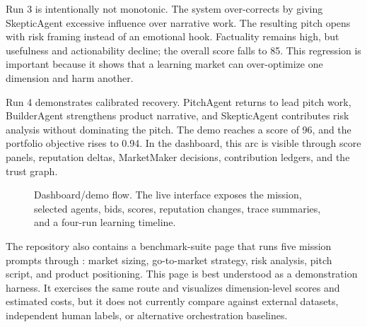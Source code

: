 Run 3 is intentionally not monotonic. The system over-corrects by giving SkepticAgent excessive influence over narrative work. The resulting pitch opens with risk framing instead of an emotional hook. Factuality remains high, but usefulness and actionability decline; the overall score falls to 85. This regression is important because it shows that a learning market can over-optimize one dimension and harm another.

Run 4 demonstrates calibrated recovery. PitchAgent returns to lead pitch work, BuilderAgent strengthens product narrative, and SkepticAgent contributes risk analysis without dominating the pitch. The demo reaches a score of 96, and the portfolio objective rises to 0.94. In the dashboard, this arc is visible through score panels, reputation deltas, MarketMaker decisions, contribution ledgers, and the trust graph.

\begin{figure}[t]
\centering
{}
\caption{Dashboard/demo flow. The live interface exposes the mission, selected agents, bids, scores, reputation changes, trace summaries, and a four-run learning timeline.}
\label{fig:dashboard}
\end{figure}

The repository also contains a benchmark-suite page that runs five mission prompts through : market sizing, go-to-market strategy, risk analysis, pitch script, and product positioning. This page is best understood as a demonstration harness. It exercises the same route and visualizes dimension-level scores and estimated costs, but it does not currently compare against external datasets, independent human labels, or alternative orchestration baselines.
